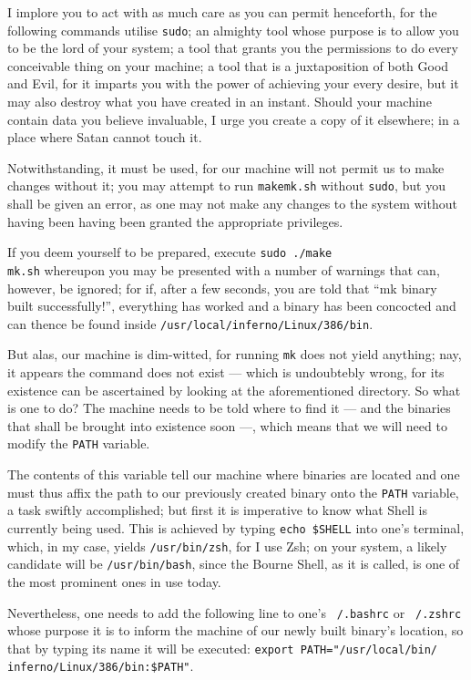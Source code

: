 \documentclass[a5paper,twoside,12pt]{report}
\begin{document}
I implore you to act with as much care as you can permit henceforth, for the following commands utilise \texttt{sudo}; an almighty tool whose purpose is to allow you to be the lord of your system; a tool that grants you the permissions to do every conceivable thing on your machine; a tool that is a juxtaposition of both Good and Evil, for it imparts you with the power of achieving your every desire, but it may also destroy what you have created in an instant. Should your machine contain data you believe invaluable, I urge you create a copy of it elsewhere; in a place where Satan cannot touch it.

Notwithstanding, it must be used, for our machine will not permit us to make changes without it; you may attempt to run \texttt{makemk.sh} without \texttt{sudo}, but you shall be given an error, as one may not make any changes to the system without having been having been granted the appropriate privileges.

If you deem yourself to be prepared, execute \texttt{sudo ./make\\mk.sh} whereupon you may be presented with a number of warnings that can, however, be ignored; for if, after a few seconds, you are told that ``mk binary built successfully!'', everything has worked and a binary has been concocted and can thence be found inside \texttt{/usr/local/inferno/Linux/386/bin}.

But alas, our machine is dim-witted, for running \texttt{mk} does not yield anything; nay, it appears the command does not exist — which is undoubtebly wrong, for its existence can be ascertained by looking at the aforementioned directory. So what is one to do? The machine needs to be told where to find it — and the binaries that shall be brought into existence soon —, which means that we will need to modify the \texttt{PATH} variable.

The contents of this variable tell our machine where binaries are located and one must thus affix the path to our previously created binary onto the \texttt{PATH} variable, a task swiftly accomplished; but first it is imperative to know what Shell is currently being used. This is achieved by typing \texttt{echo \$SHELL} into one's terminal, which, in my case, yields \texttt{/usr/bin/zsh}, for I use Zsh; on your system, a likely candidate will be \texttt{/usr/bin/bash}, since the Bourne Shell, as it is called, is one of the most prominent ones in use today.

Nevertheless, one needs to add the following line to one's \texttt{~/.bashrc} or \texttt{~/.zshrc} whose purpose it is to inform the machine of our newly built binary's location, so that by typing its name it will be executed: \texttt{export PATH="/usr/local/bin/\\inferno/Linux/386/bin:\$PATH"}.
\end{document}
